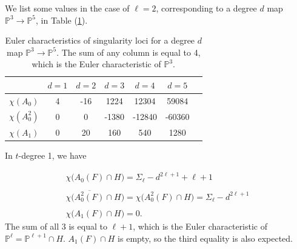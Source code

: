 \documentclass[11pt]{article}
\theoremstyle{plain}
\theoremstyle{definition}
\theoremstyle{definition}
\newcommand{\bb}[1]{\mathbb{#1}}
\begin{document}
We list some values in the case of $\ell=2$, corresponding to a degree $d$ map $\mathbb P^3\to \mathbb P^5$, in Table (\ref{Euler chars}).

\begin{table}
    \centering
    \begin{tabular}{|c|c|c|c|c|c|c|}
         \hline&  $d=1$  &$d=2$  &$d=3$  &$d=4$  &$d=5$ \\\hline
         $\chi(A_0)$&  4& -16 &1224  &12304  &59084  \\\hline
         $\chi(A_0^2)$&0  &0  &-1380  &-12840  &-60360   \\\hline
         $\chi(A_1)$&  0&20  &160  &540  &1280   \\\hline
    \end{tabular}
    \caption{Euler characteristics of singularity loci for a degree $d$ map $\bb P^3\to \bb P^5$. The sum of any column is equal to 4, which is the Euler characteristic of $\bb P^3$.}
    \label{Euler chars}
\end{table}
In $t$-degree 1, we have

\begin{gather*}
\chi\big(A_0(F)\cap H\big) = \Sigma_\ell-d^{2\ell+1}+\ell+1\\\\
\chi\big(\overline{A_0^2(F)}\cap H \big) = \chi\big(A_0^2(F)\cap H\big) = \Sigma_\ell-d^{2\ell+1}\\\\
\chi\big(A_1(F)\cap H\big) = 0.
\end{gather*}
 The sum of all 3 is equal to $\ell+1$, which is the Euler characteristic of $\mathbb P^{\ell}=\mathbb P^{\ell+1}\cap H$. $A_1(F)\cap H$ is empty, so the third equality is also expected. 
\end{document}
